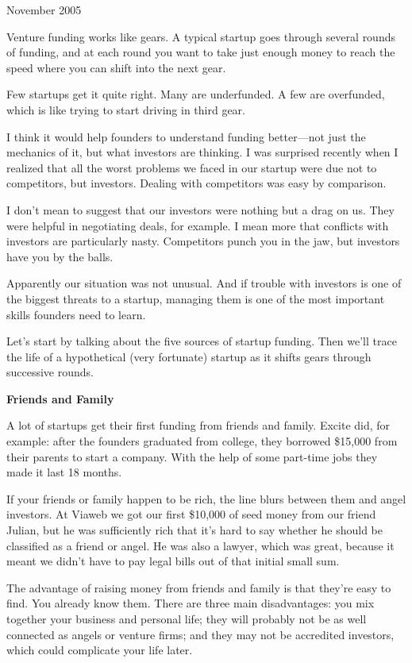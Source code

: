 November 2005

Venture funding works like gears. A typical startup goes through several
rounds of funding, and at each round you want to take just enough money
to reach the speed where you can shift into the next gear.

Few startups get it quite right. Many are underfunded. A few are
overfunded, which is like trying to start driving in third gear.

I think it would help founders to understand funding better---not just
the mechanics of it, but what investors are thinking. I was surprised
recently when I realized that all the worst problems we faced in our
startup were due not to competitors, but investors. Dealing with
competitors was easy by comparison.

I don't mean to suggest that our investors were nothing but a drag on
us. They were helpful in negotiating deals, for example. I mean more
that conflicts with investors are particularly nasty. Competitors punch
you in the jaw, but investors have you by the balls.

Apparently our situation was not unusual. And if trouble with investors
is one of the biggest threats to a startup, managing them is one of the
most important skills founders need to learn.

Let's start by talking about the five sources of startup funding. Then
we'll trace the life of a hypothetical (very fortunate) startup as it
shifts gears through successive rounds.

\textbf{Friends and Family}

A lot of startups get their first funding from friends and family.
Excite did, for example: after the founders graduated from college, they
borrowed \$15,000 from their parents to start a company. With the help
of some part-time jobs they made it last 18 months.

If your friends or family happen to be rich, the line blurs between them
and angel investors. At Viaweb we got our first \$10,000 of seed money
from our friend Julian, but he was sufficiently rich that it's hard to
say whether he should be classified as a friend or angel. He was also a
lawyer, which was great, because it meant we didn't have to pay legal
bills out of that initial small sum.

The advantage of raising money from friends and family is that they're
easy to find. You already know them. There are three main disadvantages:
you mix together your business and personal life; they will probably not
be as well connected as angels or venture firms; and they may not be
accredited investors, which could complicate your life later.

